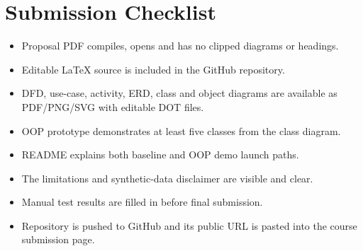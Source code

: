 \documentclass[11pt,a4paper]{article}
\begin{document}
\section{Submission Checklist}
\begin{itemize}[label=$\square$]
  \item Proposal PDF compiles, opens and has no clipped diagrams or headings.
  \item Editable LaTeX source is included in the GitHub repository.
  \item DFD, use-case, activity, ERD, class and object diagrams are available as PDF/PNG/SVG with editable DOT files.
  \item OOP prototype demonstrates at least five classes from the class diagram.
  \item README explains both baseline and OOP demo launch paths.
  \item The limitations and synthetic-data disclaimer are visible and clear.
  \item Manual test results are filled in before final submission.
  \item Repository is pushed to GitHub and its public URL is pasted into the course submission page.
\end{itemize}
\end{document}

